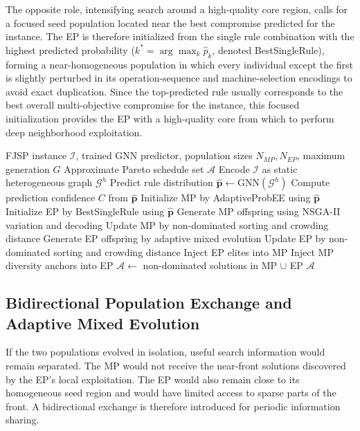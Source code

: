 \documentclass[pdflatex,iicol,Numbered,sn-basic]{sn-jnl}
\begin{document}
The opposite role, intensifying search around a high-quality core region, calls for a focused seed population located near the best compromise predicted for the instance. The EP is therefore initialized from the single rule combination with the highest predicted probability ($k^{*}=\arg\max_k \hat{p}_k$, denoted BestSingleRule), forming a near-homogeneous population in which every individual except the first is slightly perturbed in its operation-sequence and machine-selection encodings to avoid exact duplication.
Since the top-predicted rule usually corresponds to the best overall multi-objective compromise for the instance, this focused initialization provides the EP with a high-quality core from which to perform deep neighborhood exploitation.

\begin{algorithm}[t]
  \caption{GNN-HDPCEA-AME for multi-objective FJSP}
  \label{alg:gnn_hdpcea}
  \begin{algorithmic}[1]
    \Require FJSP instance $\mathcal{I}$, trained GNN predictor, population sizes $N_{MP},N_{EP}$, maximum generation $G$
    \Ensure Approximate Pareto schedule set $\mathcal{A}$
    \State Encode $\mathcal{I}$ as static heterogeneous graph $\mathcal{G}^{h}$
    \State Predict rule distribution $\hat{\mathbf{p}} \leftarrow \mathrm{GNN}(\mathcal{G}^{h})$
    \State Compute prediction confidence $C$ from $\hat{\mathbf{p}}$
    \State Initialize MP by AdaptiveProbEE using $\hat{\mathbf{p}}$
    \State Initialize EP by BestSingleRule using $\hat{\mathbf{p}}$
    \State Generate MP offspring using NSGA-II variation and decoding
    \State Update MP by non-dominated sorting and crowding distance
    \State Generate EP offspring by adaptive mixed evolution
    \State Update EP by non-dominated sorting and crowding distance
    \State Inject EP elites into MP
    \State Inject MP diversity anchors into EP
    \EndIf
    \EndFor
    \State $\mathcal{A}\leftarrow$ non-dominated solutions in MP $\cup$ EP
    \State \Return $\mathcal{A}$
  \end{algorithmic}
\end{algorithm}


\subsection{Bidirectional Population Exchange and Adaptive Mixed Evolution}\label{subsec:exchange_ame}

If the two populations evolved in isolation, useful search information would remain separated. The MP would not receive the near-front solutions discovered by the EP's local exploitation. The EP would also remain close to its homogeneous seed region and would have limited access to sparse parts of the front.
A bidirectional exchange is therefore introduced for periodic information sharing.
\end{document}
